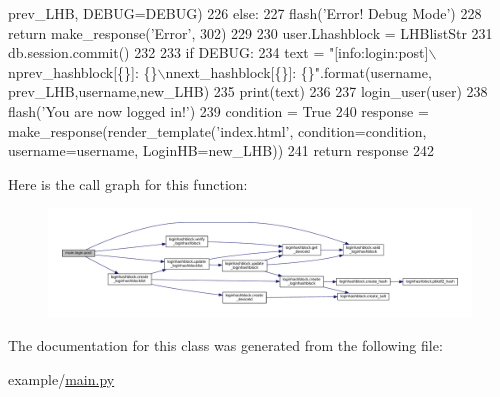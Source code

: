 \begin{DoxyCode}
      prev\_LHB, DEBUG=DEBUG)
226             \textcolor{keywordflow}{else}:
227                 flash(\textcolor{stringliteral}{'Error! Debug Mode'})
228                 \textcolor{keywordflow}{return} make\_response(\textcolor{stringliteral}{'Error'}, 302)
229 
230         user.Lhashblock = LHBlistStr
231         db.session.commit()
232 
233         \textcolor{keywordflow}{if} DEBUG:
234             text = \textcolor{stringliteral}{"[info:login:post]\(\backslash\)nprev\_hashblock[\{\}]: \{\}\(\backslash\)nnext\_hashblock[\{\}]: \{\}"}.format(username,
      prev\_LHB,username,new\_LHB)
235             print(text)
236 
237         login\_user(user)
238         flash(\textcolor{stringliteral}{'You are now logged in!'})
239         condition = \textcolor{keyword}{True}
240         response = make\_response(render\_template(\textcolor{stringliteral}{'index.html'}, condition=condition, username=username, 
      LoginHB=new\_LHB))
241         \textcolor{keywordflow}{return} response
242 
\end{DoxyCode}


Here is the call graph for this function\+:\nopagebreak
\begin{figure}[H]
\begin{center}
\leavevmode
\includegraphics[width=350pt]{classmain_1_1login_a71ff3f89aaf0f0c8502577445ab38744_cgraph}
\end{center}
\end{figure}




The documentation for this class was generated from the following file\+:\begin{DoxyCompactItemize}
\item 
example/\hyperlink{main_8py}{main.\+py}\end{DoxyCompactItemize}
